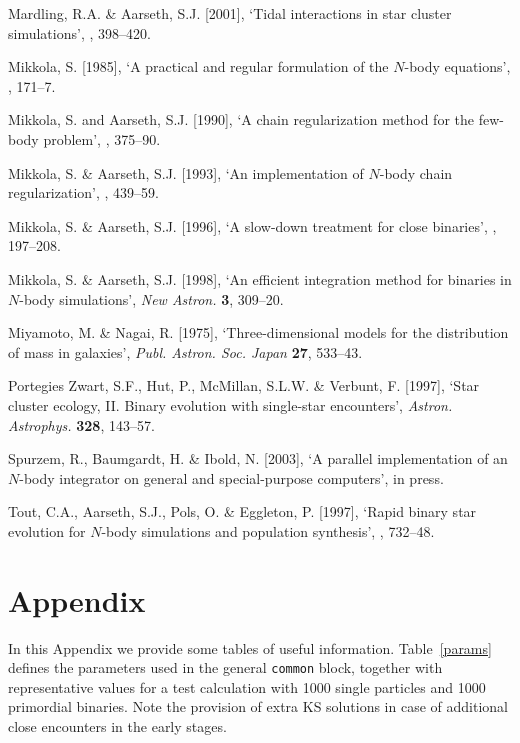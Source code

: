 \documentclass[12pt]{article}
\begin{document}
\medskip
\noindent
Mardling, R.A. \& Aarseth, S.J. [2001], `Tidal interactions in star cluster simulations',
, 398--420.

\medskip
\noindent
Mikkola, S. [1985], `A practical and regular formulation of the $N$-body equations',
, 171--7.

\medskip
\noindent
Mikkola, S. and Aarseth, S.J. [1990], `A chain regularization method for the
few-body problem',
, 375--90.

\medskip
\noindent
Mikkola, S. \& Aarseth, S.J. [1993], `An implementation of $N$-body chain
\hbox{regularization',}
, 439--59.

\medskip
\noindent
Mikkola, S. \& Aarseth, S.J. [1996], `A slow-down treatment for close binaries',
, 197--208.

\medskip
\noindent
Mikkola, S. \& Aarseth, S.J. [1998], `An efficient integration method for
binaries in $N$-body simulations',
{\it New Astron.} {\bf 3}, 309--20.

\medskip
\noindent
Miyamoto, M. \& Nagai, R. [1975], `Three-dimensional models for the distribution
of mass in galaxies', {\it Publ. Astron. Soc. Japan} {\bf 27}, 533--43.

\medskip
\noindent
Portegies Zwart, S.F., Hut, P., McMillan, S.L.W. \& Verbunt, F. [1997],
`Star cluster ecology, II. Binary evolution with single-star encounters',
{\it Astron. Astrophys.} {\bf 328}, 143--57.

\medskip
\noindent
Spurzem, R., Baumgardt, H. \& Ibold, N. [2003], `A parallel implementation of an
$N$-body integrator on general and special-purpose computers',
\MN in press.

\medskip
\noindent
Tout, C.A., Aarseth, S.J., Pols, O. \& Eggleton, P. [1997], `Rapid binary
star evolution for $N$-body simulations and population synthesis',
, 732--48.

\newpage

\section{Appendix}

In this Appendix we provide some tables of useful information.
Table~\ref{params} defines the parameters used in the general {\tt common}
block, together with representative values for a test calculation with 1000
single particles and 1000 primordial binaries. Note the provision of extra
KS solutions in case of additional close encounters in the early stages.
\end{document}
